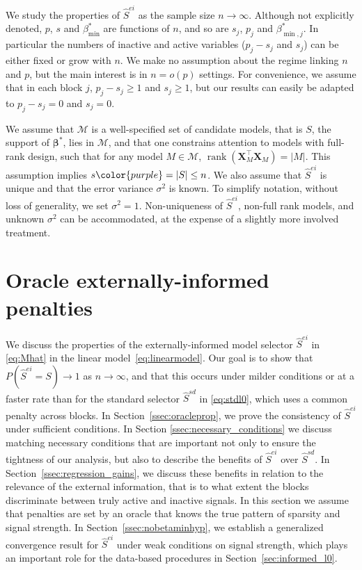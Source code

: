 \documentclass[
  12pt]{article}
\newcommand{\pch}[1]{{{\color{purple}  #1}}}
\newcommand{\M}{\mathcal{M}}
\newcommand{\bbeta}{\boldsymbol{\beta}}
\newcommand{\bX}{\mathbf{X}}
\begin{document}
We study the properties of $\hat{S}^{ei}$ as the sample size $n \to \infty$.
Although not explicitly denoted, $p$, $s$ and $\beta_{\min}^*$ are functions of $n$, and so are $s_j$, $p_j$ and $\beta_{\min,j}^*$. In particular the numbers of inactive and active variables ($p_j-s_j$ and $s_j$) can be either fixed or grow with $n$. We make no assumption about the regime linking $n$ and $p$, but the main interest is in $n= o(p)$ settings. For convenience, we assume that in each block $j$, $p_j-s_j\geq1$ and $s_j\geq1$, but our results can easily be adapted to $p_j-s_j=0$ and $s_j=0$.

We assume that $\M$ is a well-specified set of candidate models, that is $S$, the support of $\bbeta^*$, lies in $\M$, and that one constrains attention to models with full-rank design, such that for any model $M \in \M$, $\operatorname{rank}(\bX_M^{\top}\bX_M)=|M|$. This assumption implies $s\pch{=|S|}\leq n$. We also assume that $\hat S^{ei}$ is unique and that the error variance $\sigma^2$ is known. To simplify notation, without loss of generality, we set $\sigma^2=1$. Non-uniqueness of $\hat{S}^{ei}$, non-full rank models, and unknown $\sigma^2$ can be accommodated, at the expense of a slightly more involved treatment.

\section{Oracle externally-informed penalties}\label{sec:properties_legression}

We discuss the properties of the externally-informed model selector $\hat S^{ei}$ in \eqref{eq:Mhat} in the linear model~\eqref{eq:linearmodel}. Our goal is to show that $P(\hat S^{ei}=S)\to 1$ as $n\to\infty$, and that this occurs under milder conditions or at a faster rate than for the standard selector $\hat S^{sd}$ in \eqref{eq:stdl0}, which uses a common penalty across blocks. In Section~\ref{ssec:oracleprop}, we prove the consistency of $\hat S^{ei}$ under sufficient conditions. In Section \ref{ssec:necessary_conditions} we discuss matching necessary conditions that are important not only to ensure the tightness of our analysis, but also to describe the benefits of $\hat S^{ei}$ over $\hat{S}^{sd}$. 
In Section~\ref{ssec:regression_gains}, we discuss these benefits in relation to the relevance of the external information, that is to what extent the blocks discriminate between truly active and inactive signals. In this section we assume that penalties are set by an oracle that knows the true pattern of sparsity and signal strength. In Section~\ref{ssec:nobetaminhyp}, we establish a generalized convergence result for $\hat S^{ei}$ under weak conditions on signal strength, which plays an important role for the data-based procedures in Section~\ref{sec:informed_l0}.
\end{document}
